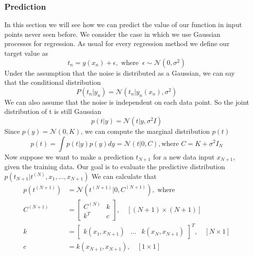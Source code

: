 \documentclass[main.tex]{subfiles}
\begin{document}
\subsubsection{Prediction}
In this section we will see how we can predict the value of our function in input points never seen before. We consider the case in which we use Gaussian processes for regression. As usual for every regression method we define our target value as
\begin{equation*}
    t_n = y(x_n) + \epsilon,\text{ where } \ \epsilon \sim \mathcal{N}(0, \sigma^2)
\end{equation*}
Under the assumption that the noise is distributed as a Gaussian, we can say that the conditional distribution
\begin{equation}
    P(t_n|y_n) = \mathcal{N}(t_n|y_n(x_n), \sigma^2)
\end{equation}
We can also assume that the noise is independent on each data point. So the joint distribution of t is still Gaussian
\begin{equation}
    p(t|y) = \mathcal{N}(t|y, \sigma^2 I)
\end{equation}
Since $p(y)=\mathcal{N}(0, K)$, we can compute the marginal distribution $p(t)$
\begin{equation}
    p(t) = \int p(t|y)p(y)dy = \mathcal{N}(t|0,C),\text{where } C = K + \sigma^2 I_N
\end{equation}
Now suppose we want to make a prediction $t_{N+1}$ for a new data input $x_{N+1}$, given the training data. Our goal is to evaluate the predictive distribution $p(t_{N+1}|t^{(N)},x_1,\dots,x_{N+1})$\footnotemark {}
We can calculate that
\begin{align*}
    p(t^{(N+1)}) &= \mathcal{N}(t^{(N+1)}|0,C^{(N+1)}), \text{ where} \\
    C^{(N+1)} &= 
    \begin{bmatrix} 
    C^{(N)} & k \\
    k^T & c
    \end{bmatrix}, \quad [(N+1) \times (N+1)] \\
    k &= \begin{bmatrix} k(x_1, x_{N+1}) & \dots & k(x_N, x_{N+1}) \end{bmatrix}^T, \quad [N \times 1] \\
    c &= k(x_{N+1},x_{N+1}), \quad [1 \times 1]
\end{align*}
\end{document}
